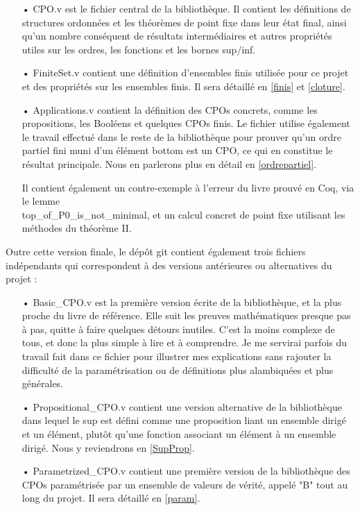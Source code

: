 \documentclass{article}
\newcommand\code[1]{{\fontfamily{lmtt}\selectfont #1}}
\theoremstyle{definition}
\begin{document}
\begin{itemize}
\item[•] \code{CPO.v} est le fichier central de la bibliothèque. Il contient les définitions de structures ordonnées et les théorèmes de point fixe dans leur état final, ainsi qu'un nombre conséquent de résultats intermédiaires et autres propriétés utiles sur les ordres, les fonctions et les bornes sup/inf.
\item[•] \code{FiniteSet.v} contient une définition d'ensembles finis utilisée pour ce projet et des propriétés sur les ensembles finis. Il sera détaillé en \ref{finis} et \ref{cloture}.
\item[•] \code{Applications.v} contient la définition des CPOs concrets, comme les propositions, les Booléens et quelques CPOs finis. Le fichier utilise également le travail effectué dans le reste de la bibliothèque pour prouver qu'un ordre partiel fini muni d'un élément bottom est un CPO, ce qui en constitue le résultat principale. Nous en parlerons plus en détail en \ref{ordrepartiel}.

Il contient également un contre-exemple à l'erreur du livre prouvé en Coq, via le lemme \\ \code{top\_of\_P0\_is\_not\_minimal}, et un calcul concret de point fixe utilisant les méthodes du théorème II.
\end{itemize}

\medskip

Outre cette version finale, le dépôt git contient également trois fichiers indépendants qui correspondent à des versions antérieures ou alternatives du projet :

\medskip

\begin{itemize}
\item[•] \code{Basic\_CPO.v} est la première version écrite de la bibliothèque, et la plus proche du livre de référence. Elle suit les preuves mathématiques presque pas à pas, quitte à faire quelques détours inutiles. C'est la moins complexe de tous, et donc la plus simple à lire et à comprendre. Je me servirai parfois du travail fait dans ce fichier pour illustrer mes explications sans rajouter la difficulté de la paramétrisation ou de définitions plus alambiquées et plus générales.
\item[•] \code{Propositional\_CPO.v} contient une version alternative de la bibliothèque dans lequel le sup est défini comme une proposition liant un ensemble dirigé et un élément, plutôt qu'une fonction associant un élément à un ensemble dirigé. Nous y reviendrons en \ref{SupProp}.
\item[•] \code{Parametrized\_CPO.v} contient une première version de la bibliothèque des CPOs paramétrisée par un ensemble de valeurs de vérité, appelé "B" tout au long du projet. Il sera détaillé en \ref{param}.
\end{itemize}
\end{document}
